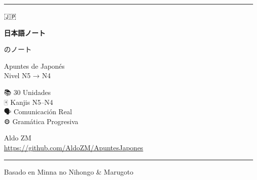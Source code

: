 ﻿%
\begin{titlepage}
  \begin{center}
    \vspace*{1.5cm}
    {\color{jpred}\rule{\linewidth}{3pt}}
    \vspace{1cm}

    {\fontsize{60}{70}\selectfont 🇯🇵}

    \vspace{0.5cm}
    {\Huge\bfseries\color{jpred} 日本語ノート}

    \vspace{0.3cm}
    {\Large\color{jpblue} のノート}

    \vspace{0.5cm}
    {\large Apuntes de Japonés} \\[0.3em]
    {\large\color{darkgray} Nivel N5 → N4}

    \vspace{1cm}
    \begin{tcolorbox}[
      width=0.65\linewidth,
      colback=jpgold!10, colframe=jpgold!70!black,
      rounded corners, halign=center
    ]
    \large
    📚 30 Unidades \\[4pt]
    🀄 Kanjis N5--N4 \\[4pt]
    🗣️ Comunicación Real \\[4pt]
    ⚙️ Gramática Progresiva
    \end{tcolorbox}

    \vspace{1cm}
    {\large Aldo ZM} \\[0.3em]
    {\small\color{darkgray}\url{https://github.com/AldoZM/ApuntesJapones}}

    \vfill
    {\color{jpred}\rule{\linewidth}{3pt}}
    {\small\color{darkgray} Basado en Minna no Nihongo & Marugoto}
  \end{center}
\end{titlepage}
